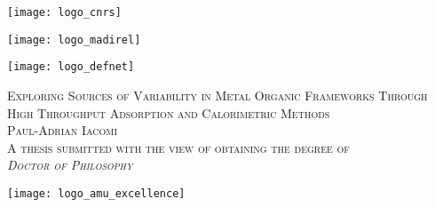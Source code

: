 \begin{titlepage}

\vspace*{-2cm}
\begin{center}
	\begin{minipage}[c]{0.3\linewidth}
		\raggedright
		\texttt{[image: logo\_cnrs]}
	\end{minipage}\hfill
	\begin{minipage}[c]{0.3\linewidth}
		\centering
		\texttt{[image: logo\_madirel]}
	\end{minipage}\hfill
	\begin{minipage}[c]{0.3\linewidth}
		\raggedleft
		\texttt{[image: logo\_defnet]}
	\end{minipage}\hfill

	\vspace{1.5cm}

	\LARGE \scshape
	Exploring Sources of Variability in Metal Organic Frameworks 
	Through High Throughput Adsorption and Calorimetric Methods \\
	\vspace{1.5cm}
	\Large \upshape 
	Paul-Adrian Iacomi \\
	\vspace{1.8cm}
	\large \upshape
	A thesis submitted with the view of obtaining the degree of \\
	\textit{Doctor of Philosophy}\\

	\vspace{1cm}
	\begin{minipage}[c]{\linewidth}
		\centering
		\texttt{[image: logo\_amu\_excellence]}
	\end{minipage}\hfill
	\vspace{1.6cm}

\end{center}


\end{titlepage}
